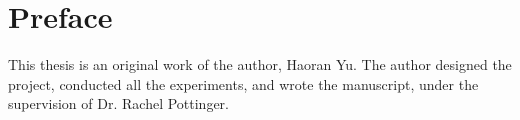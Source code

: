 
\chapter{Preface}

This thesis is an original work of the author, Haoran Yu. The author designed the project, conducted all the experiments, and wrote the manuscript, under the supervision of Dr. Rachel Pottinger.
